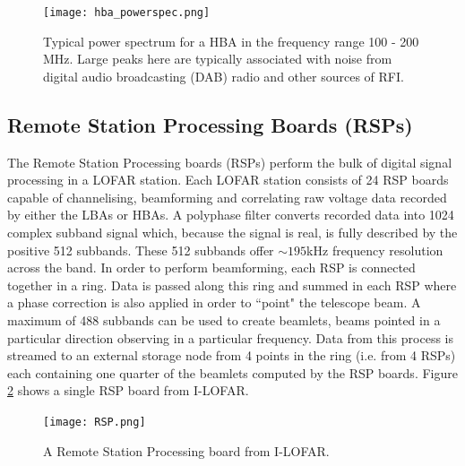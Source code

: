 \begin{figure}[ht]
    \centering
    \texttt{[image: hba\_powerspec.png]}
    \caption[Typical power spectrum for a HBA 100 - 200 MHz.]{Typical power spectrum for a HBA in the frequency range 100 - 200 MHz. Large peaks here are typically associated with noise from digital audio broadcasting (DAB) radio and other sources of RFI.}
    \label{fig:HBA_power_spec}
\end{figure}

\subsection{Remote Station Processing Boards (RSPs)}
\label{sec:rsp}
The Remote Station Processing boards (RSPs) perform the bulk of digital signal processing in a LOFAR station. Each LOFAR station consists of 24 RSP boards capable of channelising, beamforming and correlating raw voltage data recorded by either the LBAs or HBAs. A polyphase filter converts recorded data into 1024 complex subband signal which, because the signal is real, is fully described by the positive 512 subbands. These 512 subbands offer $\sim 195$kHz frequency resolution across the band. In order to perform beamforming, each RSP is connected together in a ring. Data is passed along this ring and summed in each RSP where a phase correction is also applied in order to ``point" the telescope beam. A maximum of 488 subbands can be used to create beamlets, beams pointed in a particular direction observing in a particular frequency. Data from this process is streamed to an external storage node from 4 points in the ring (i.e. from 4 RSPs) each containing one quarter of the beamlets computed by the RSP boards. Figure \ref{fig:RSP} shows a single RSP board from I-LOFAR.

\begin{figure}[ht]
\centering
\texttt{[image: RSP.png]}
\caption[A Remote Station Processing board.]{A Remote Station Processing board from I-LOFAR.}
\label{fig:RSP}
\end{figure}

